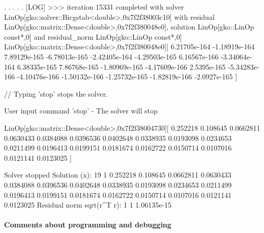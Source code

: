 \begin{DoxyCode}
.
.
.
.
.
[LOG] >>> iteration 15331 completed with solver LinOp[gko::solver::Bicgstab<double>,0x7f2f38003c10] with 
      residual LinOp[gko::matrix::Dense<double>,0x7f2f380048e0], solution LinOp[gko::LinOp \textcolor{keyword}{const}*,0] and 
      residual\_norm LinOp[gko::LinOp \textcolor{keyword}{const}*,0]
LinOp[gko::matrix::Dense<double>,0x7f2f380048e0][
        6.21705e-164
        -1.18919e-164
        7.89129e-165
        -6.78013e-165
        -2.42405e-164
        -4.29503e-165
        6.16567e-166
        -3.34064e-164
        6.38335e-165
        7.86768e-165
        -1.80969e-165
        -4.17609e-166                   
        2.5395e-165
        -5.34283e-166
        -4.10476e-166
        -1.50132e-166
        -1.25732e-165
        -1.82819e-166
        -2.0927e-165
]        

\textcolor{comment}{// Typing 'stop' stops the solver.}

User input command \textcolor{stringliteral}{'stop'} - The solver will stop

LinOp[gko::matrix::Dense<double>,0x7f2f38004730][
        0.252218
        0.108645
        0.0662811
        0.0630433
        0.0384088
        0.0396536
        0.0402648
        0.0338935
        0.0193098
        0.0234653
        0.0211499
        0.0196413
        0.0199151
        0.0181674
        0.0162722
        0.0150714
        0.0107016
        0.0121141
        0.0123025
]

Solver stopped
Solution (x):
19 1
0.252218
0.108645
0.0662811
0.0630433
0.0384088
0.0396536
0.0402648
0.0338935
0.0193098
0.0234653
0.0211499
0.0196413
0.0199151
0.0181674
0.0162722
0.0150714
0.0107016
0.0121141
0.0123025
Residual norm sqrt(r^T r):
1 1
1.06135e-15
\end{DoxyCode}


\label{_Commentsaboutprogramminganddebugging}%
\paragraph*{Comments about programming and debugging }

\label{_PlainProg}%
